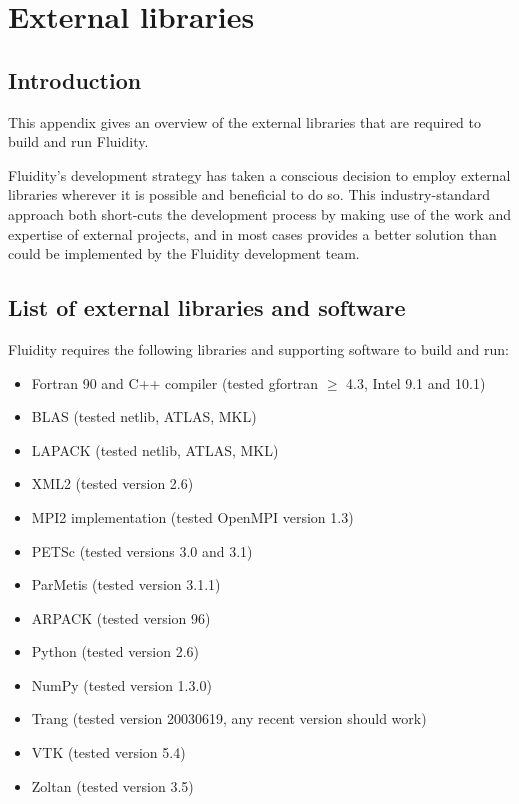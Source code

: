 \chapter{External libraries}\label{chap:external}

\section{Introduction}

This appendix gives an overview of the external libraries that are required to
build and run Fluidity.

Fluidity's development strategy has taken a conscious decision to employ
external libraries wherever it is possible and beneficial to do so. This
industry-standard approach both short-cuts the development process by making
use of the work and expertise of external projects, and in most cases provides
a better solution than could be implemented by the Fluidity development team.

\section{List of external libraries and software}
\label{sec:required_ḻibraries_list}

Fluidity requires the following libraries and supporting software to build and
run:

\begin{itemize}
\item Fortran 90 and C++ compiler (tested gfortran $\geq$ 4.3, Intel 9.1 and 10.1)
\item BLAS (tested netlib, ATLAS, MKL)
\item LAPACK (tested netlib, ATLAS, MKL)
\item XML2 (tested version 2.6)
\item MPI2 implementation (tested OpenMPI version 1.3)
\item PETSc (tested versions 3.0 and 3.1)
\item ParMetis (tested version 3.1.1)
\item ARPACK (tested version 96)
\item Python (tested version 2.6) 
\item NumPy (tested version 1.3.0)
\item Trang (tested version 20030619, any recent version should work)
\item VTK (tested version 5.4)
\item Zoltan (tested version 3.5)
\end{itemize}

